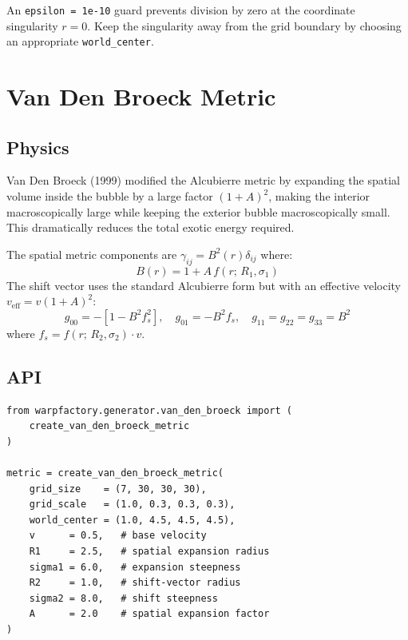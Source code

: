 \documentclass[11pt, a4paper, twoside]{report}
\begin{document}
\begin{infobox}
An \texttt{epsilon = 1e-10} guard prevents division by zero at the
coordinate singularity $r = 0$.  Keep the singularity away from the grid
boundary by choosing an appropriate \texttt{world\_center}.
\end{infobox}

\section{Van Den Broeck Metric}
\label{sec:vdb}

\subsection{Physics}

Van Den Broeck (1999) modified the Alcubierre metric by expanding
the spatial volume inside the bubble by a large factor $(1+A)^2$,
making the interior macroscopically large while keeping the exterior
bubble macroscopically small.  This dramatically reduces the total
exotic energy required.

The spatial metric components are $\gamma_{ij} = B^2(r)\delta_{ij}$
where:
\begin{equation}
  B(r) = 1 + A\,f(r;\,R_1,\sigma_1)
\end{equation}
The shift vector uses the standard Alcubierre form but with an
effective velocity $v_\text{eff} = v(1+A)^2$:
\begin{equation}
  g_{00} = -\!\left[1 - B^2 f_s^2\right],\quad
  g_{01} = -B^2 f_s, \quad
  g_{11} = g_{22} = g_{33} = B^2
\end{equation}
where $f_s = f(r;\,R_2,\sigma_2)\cdot v$.

\subsection{API}

\begin{lstlisting}[caption={Van Den Broeck metric}]
from warpfactory.generator.van_den_broeck import (
    create_van_den_broeck_metric
)

metric = create_van_den_broeck_metric(
    grid_size    = (7, 30, 30, 30),
    grid_scale   = (1.0, 0.3, 0.3, 0.3),
    world_center = (1.0, 4.5, 4.5, 4.5),
    v      = 0.5,   # base velocity
    R1     = 2.5,   # spatial expansion radius
    sigma1 = 6.0,   # expansion steepness
    R2     = 1.0,   # shift-vector radius
    sigma2 = 8.0,   # shift steepness
    A      = 2.0    # spatial expansion factor
)
\end{lstlisting}
\end{document}
